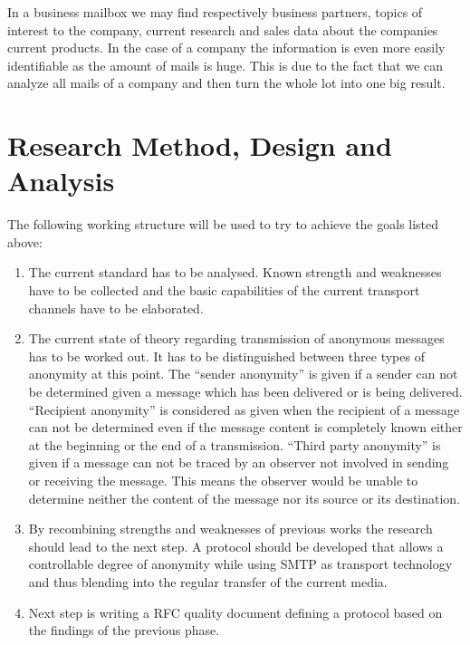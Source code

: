 \documentclass[twocolumn,a4paper,10pt,english]{scrartcl}
\begin{document}
In a business mailbox we may find respectively business partners, topics of interest to the company, current research and sales data about the companies current products. In the case of a company the information is even more easily identifiable as the amount of mails is huge. This is due to the fact that we can analyze all mails of a company and then turn the whole lot into one big result.\par

\section{Research Method, Design and Analysis}
The following working structure will be used to try to achieve the goals listed above:\par
\begin{enumerate}
\item The current standard has to be analysed. Known strength and weaknesses have to be collected and the basic capabilities of the current transport channels have to be elaborated. \par

\item The current state of theory regarding transmission of anonymous messages has to be worked out. It has to be distinguished between three types of anonymity at this point. The ``sender anonymity'' is given if a sender can not be determined given a message which has been delivered or is being delivered. ``Recipient anonymity'' is considered as given when the recipient of a message can not be determined even if the message content is completely known either at the beginning or the end of a transmission. ``Third party anonymity'' is given if a message can not be traced by an observer not involved in sending or receiving the message. This means the observer would be unable to determine neither the content of the message nor its source or its destination. \par

\item By recombining strengths and weaknesses of previous works the research should lead to the next step. A protocol should be developed that allows a controllable degree of anonymity while using SMTP as transport technology and thus blending into the regular transfer of the current media. \par

\item Next step is writing a RFC quality document defining a protocol based on the findings of the previous phase. \par


\end{enumerate}
\end{document}
